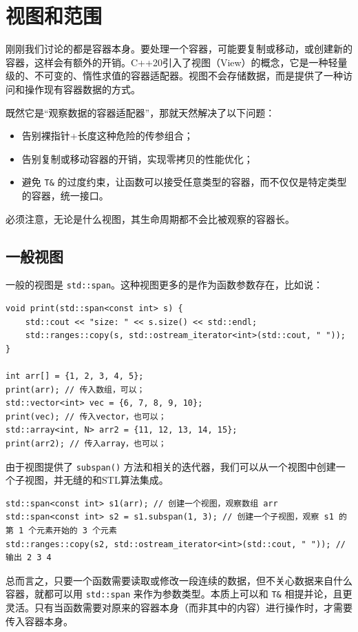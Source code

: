 \section{视图和范围}

刚刚我们讨论的都是容器本身。要处理一个容器，可能要复制或移动，或创建新的容器，这样会有额外的开销。C++20引入了视图（View）的概念，它是一种轻量级的、不可变的、惰性求值的容器适配器。视图不会存储数据，而是提供了一种访问和操作现有容器数据的方式。

既然它是“观察数据的容器适配器”，那就天然解决了以下问题：
\begin{itemize}
    \item 告别裸指针+长度这种危险的传参组合；
    \item 告别复制或移动容器的开销，实现零拷贝的性能优化；
    \item 避免 \verb|T&| 的过度约束，让函数可以接受任意类型的容器，而不仅仅是特定类型的容器，统一接口。
\end{itemize}

必须注意，无论是什么视图，其生命周期都不会比被观察的容器长。

\subsection{一般视图}

一般的视图是 \verb|std::span|。这种视图更多的是作为函数参数存在，比如说：
\begin{verbatim}
void print(std::span<const int> s) {
    std::cout << "size: " << s.size() << std::endl;
    std::ranges::copy(s, std::ostream_iterator<int>(std::cout, " "));
}

int arr[] = {1, 2, 3, 4, 5};
print(arr); // 传入数组，可以；
std::vector<int> vec = {6, 7, 8, 9, 10};
print(vec); // 传入vector，也可以；
std::array<int, N> arr2 = {11, 12, 13, 14, 15};
print(arr2); // 传入array，也可以；
\end{verbatim}

由于视图提供了 \verb|subspan()| 方法和相关的迭代器，我们可以从一个视图中创建一个子视图，并无缝的和STL算法集成。
\begin{verbatim}
std::span<const int> s1(arr); // 创建一个视图，观察数组 arr
std::span<const int> s2 = s1.subspan(1, 3); // 创建一个子视图，观察 s1 的第 1 个元素开始的 3 个元素
std::ranges::copy(s2, std::ostream_iterator<int>(std::cout, " ")); // 输出 2 3 4
\end{verbatim}

总而言之，只要一个函数需要读取或修改一段连续的数据，但不关心数据来自什么容器，就都可以用 \verb|std::span| 来作为参数类型。本质上可以和 \verb|T&| 相提并论，且更灵活。只有当函数需要对原来的容器本身（而非其中的内容）进行操作时，才需要传入容器本身。

